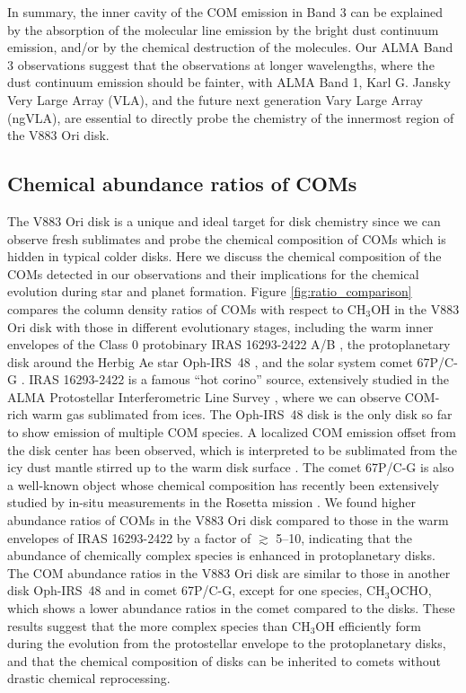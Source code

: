 \documentclass[twocolumn, twocolappendix, astrosymb, times]{aastex631}
\newcommand{\methanol}{CH$_3$OH\xspace}
\newcommand{\methylformate}{CH$_3$OCHO\xspace}
\begin{document}
In summary, the inner cavity of the COM emission in Band 3 can be explained by the absorption of the molecular line emission by the bright dust continuum emission, and/or by the chemical destruction of the molecules. Our ALMA Band 3 observations suggest that the observations at longer wavelengths, where the dust continuum emission should be fainter, with ALMA Band 1, Karl G. Jansky Very Large Array (VLA), and the future next generation Vary Large Array (ngVLA), are essential to directly probe the chemistry of the innermost region of the V883 Ori disk.

\subsection{Chemical abundance ratios of COMs}\label{subsec:abundance_ratio}
The V883 Ori disk is a unique and ideal target for disk chemistry since we can observe fresh sublimates and probe the chemical composition of COMs which is hidden in typical colder disks. Here we discuss the chemical composition of the COMs detected in our observations and their implications for the chemical evolution during star and planet formation. 
Figure \ref{fig:ratio_comparison} compares the column density ratios of COMs with respect to \methanol in the V883 Ori disk with those in different evolutionary stages, including the warm inner envelopes of the Class 0 protobinary IRAS 16293-2422 A/B \citep[][see also \citealt{Drozdovskaya2019}]{Lykke2017, Jorgensen2018, Manigand2020, Manigand2021}, the protoplanetary disk around the Herbig Ae star Oph-IRS~48 \citep{Brunken2022}, and the solar system comet 67P/C-G \citep[][see also \citealt{Drozdovskaya2019}]{Rubin2019, Schuhmann2019}. IRAS 16293-2422 is a famous ``hot corino'' source, extensively studied in the ALMA Protostellar Interferometric Line Survey \citep[PILS;][]{Jorgensen2016}, where we can observe COM-rich warm gas sublimated from ices. The Oph-IRS~48 disk is the only disk so far to show emission of multiple COM species. A localized COM emission offset from the disk center has been observed, which is interpreted to be sublimated from the icy dust mantle stirred up to the warm disk surface \citep{vanderMarel2021, Brunken2022}. The comet 67P/C-G is also a well-known object whose chemical composition has recently been extensively studied by in-situ measurements in the Rosetta mission \citep[e.g.,][]{Altwegg2019}. We found higher abundance ratios of COMs in the V883 Ori disk compared to those in the warm envelopes of IRAS 16293-2422 by a factor of $\gtrsim$ 5--10, indicating that the abundance of chemically complex species is enhanced in protoplanetary disks. The COM abundance ratios in the V883 Ori disk are similar to those in another disk Oph-IRS~48 and in comet 67P/C-G, except for one species, \methylformate, which shows a lower abundance ratios in the comet compared to the disks. These results suggest that the more complex species than \methanol efficiently form during the evolution from the protostellar envelope to the protoplanetary disks, and that the chemical composition of disks can be inherited to comets without drastic chemical reprocessing. 
\end{document}
